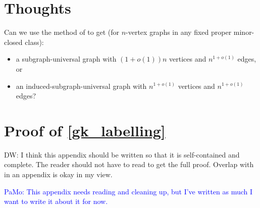 \documentclass{patmorin}
\newcommand{\david}[1]{{\color{orange} DW: #1}}
\newcommand{\pat}[1]{\textcolor{Blue}{PaMo: #1}}
\begin{document}

\section{Thoughts}

Can we use the method of \citet{EJM23} to get (for $n$-vertex graphs in any fixed proper minor-closed class):
\begin{itemize}
\item a subgraph-universal graph with $(1+o(1))n$ vertices and $n^{1+o(1)}$ edges, or
\item an induced-subgraph-universal graph with
$n^{1+o(1)}$ vertices and $n^{1+o(1)}$ edges?
\end{itemize}


  
  

  \appendix
  \section{Proof of \cref{gk_labelling}}
  \label{weighted_product_proof}

\david{I think this appendix should be written so that it is self-contained and complete. The reader should not have to read  \citet{dujmovic.esperet.ea:adjacency} to get the full proof. Overlap with \citet{dujmovic.esperet.ea:adjacency} in an appendix is okay in my view.}

\pat{This appendix needs reading and cleaning up, but I've written as much I want to write it about it for now.}



\end{document}

